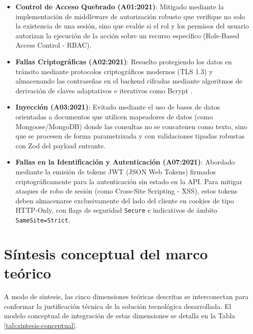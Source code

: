 \begin{itemize}
    \item \textbf{Control de Acceso Quebrado (A01:2021)}: Mitigado mediante la implementación de middleware de autorización robusto que verifique no solo la existencia de una sesión, sino que evalúe si el rol y los permisos del usuario autorizan la ejecución de la acción sobre un recurso específico (Role-Based Access Control - RBAC).
    \item \textbf{Fallas Criptográficas (A02:2021)}: Resuelto protegiendo los datos en tránsito mediante protocolos criptográficos modernos (TLS 1.3) y almacenando las contraseñas en el backend cifradas mediante algoritmos de derivación de claves adaptativos e iterativos como Bcrypt \cite{owasp_top10}.
    \item \textbf{Inyección (A03:2021)}: Evitado mediante el uso de bases de datos orientadas a documentos que utilicen mapeadores de datos (como Mongoose/MongoDB) donde las consultas no se concatenen como texto, sino que se procesen de forma parametrizada y con validaciones tipadas robustas con Zod del payload entrante.
    \item \textbf{Fallas en la Identificación y Autenticación (A07:2021)}: Abordado mediante la emisión de tokens JWT (JSON Web Tokens) firmados criptográficamente para la autenticación sin estado en la API. Para mitigar ataques de robo de sesión (como Cross-Site Scripting - XSS), estos tokens deben almacenarse exclusivamente del lado del cliente en cookies de tipo HTTP-Only, con flags de seguridad \texttt{Secure} e indicativos de ámbito \texttt{SameSite=Strict}.
\end{itemize}

\section{Síntesis conceptual del marco teórico}

A modo de síntesis, las cinco dimensiones teóricas descritas se interconectan para conformar la justificación técnica de la solución tecnológica desarrollada. El modelo conceptual de integración de estas dimensiones se detalla en la Tabla \ref{tab:sintesis-conceptual}.

